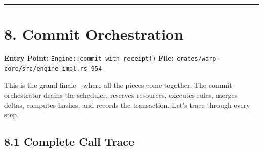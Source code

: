 \documentclass[11pt]{book}
\begin{document}
\begin{center}\rule{0.5\linewidth}{0.5pt}\end{center}

\section{8. Commit Orchestration}\label{commit-orchestration}

\textbf{Entry Point:} \texttt{Engine::commit\_with\_receipt()}
\textbf{File:} \texttt{crates/warp-core/src/engine\_impl.rs-954}

\begin{tourguide}
This is the grand finale---where all the pieces come together. The commit orchestrator drains the scheduler, reserves resources, executes rules, merges deltas, computes hashes, and records the transaction. Let's trace through every step.
\end{tourguide}

\subsection{8.1 Complete Call Trace}\label{complete-call-trace-3}
\end{document}

